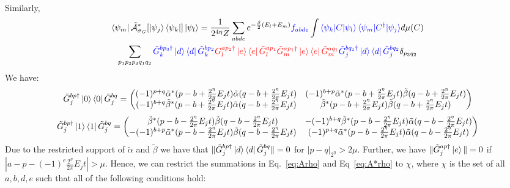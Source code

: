\documentclass[aps,floatfix,10pt,amssymb,amsfont,amsmath,superscriptaddress,float,nofootinbib,longbibliography,nobalancelastpage,twocolumn]{revtex4-2}
\begin{document}
\begin{widetext}
\begin{multline}
    \label{eq:Arho}
\end{multline}
Similarly,
\begin{multline}
   \bra{\psi_m}\tilde{\mathcal{A}}^*_{\sigma_G}[\ket{\psi_j}\bra{\psi_k}]\ket{\psi_l} =\frac{1}{2^{4\eta}Z} \sum_{abde} e^{-\frac{\beta}{2}(E_l+E_m)}\textcolor{blue}{f_{abde}} \int \textcolor{blue}{\braket{\psi_k|C|\psi_l}\braket{\psi_m|C^{\dagger}|\psi_j}} d\mu(C)\\\sum_{p_1p_2 p_3q_1 q_2} \textcolor{blue}{\tilde G^{bp_3\dagger}_k\ket{d}\bra{d}\tilde G^{bp_2}_k} \textcolor{red}{G_l^{ap_2\dagger}\ket{e}\bra{e}\tilde G_l^{ap_1}\tilde G_m^{ap_1\dagger}\ket{e}\bra{e}\tilde G_m^{aq_1}} \textcolor{blue}{\tilde G^{bq_1\dagger}_j\ket{d}\bra{d}\tilde G^{bq_2}_j } \delta_{p_3q_2}
    \label{eq:A*rho}
\end{multline}
We have:
\begin{equation}
    \tilde G^{bp\dagger}_{j}\ket{0}\bra{0} \tilde G^{bq}_{j} = \begin{pmatrix}
        (-1)^{p+q}\tilde \alpha^*(p-b+\frac{2^{\eta}}{2\pi}E_{j}t)\tilde  \alpha(q-b+\frac{2^{\eta}}{2\pi}E_{j}t) &(-1)^{b+p}\tilde  \alpha^*(p-b+\frac{2^{\eta}}{2\pi}E_{j}t)\tilde  \beta(q-b+\frac{2^{\eta}}{2\pi}E_{j}t)  \\(-1)^{b+q}\tilde  \beta^*(p-b+\frac{2^{\eta}}{2\pi}E_{j}t)\tilde  \alpha(q-b+\frac{2^{\eta}}{2\pi}E_{j}t) & \tilde  \beta^*(p-b+\frac{2^{\eta}}{2\pi}E_{j}t)\tilde  \beta(q-b+\frac{2^{\eta}}{2\pi}E_{j}t)
    \end{pmatrix}
\end{equation} 
\begin{equation}
    \tilde G^{bp\dagger}_{j}\ket{1}\bra{1} \tilde G^{bq}_{j} = \begin{pmatrix}
        \tilde \beta^*(p-b-\frac{2^{\eta}}{2\pi}E_{j}t)\tilde  \beta(q-b-\frac{2^{\eta}}{2\pi}E_{j}t) &  -(-1)^{b+q}\tilde  \beta^*(p-b-\frac{2^{\eta}}{2\pi}E_{j}t)\tilde \alpha(q-b-\frac{2^{\eta}}{2\pi}E_{j}t) \\
        -(-1)^{b+p}\tilde  \alpha^*(p-b-\frac{2^{\eta}}{2\pi}E_{j}t)\tilde  \beta(q-b-\frac{2^{\eta}}{2\pi}E_{j}t) & (-1)^{p+q}\tilde  \alpha^*(p-b-\frac{2^{\eta}}{2\pi}E_{j}t)\tilde \alpha(q-b-\frac{2^{\eta}}{2\pi}E_{j}t)
    \end{pmatrix}
\end{equation} 
Due to the restricted support of $\tilde \alpha$ and $\tilde \beta$ we have that $\|\tilde G^{bp\dagger}_{j}\ket{d}\bra{d}\tilde G^{bq}_{j}\| = 0$ for $|p-q|_{2^{\eta}} > 2\mu$. Further, we have $\|\tilde G^{ap \dagger}_j \ket{e}\| = 0$ if $|a-p-(-1)^e\frac{2^{\eta}}{2\pi}E_{j}t| > \mu$. Hence, we can restrict the summations in Eq.~\eqref{eq:Arho} and Eq~\eqref{eq:A*rho} to $\chi$, where $\chi$ is the set of all $a,b,d,e$ such that all of the following conditions hold:

\end{widetext}
\end{document}

